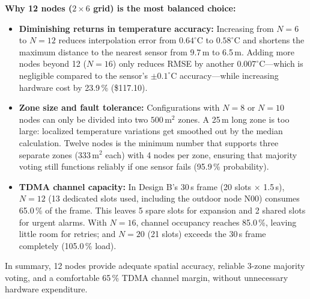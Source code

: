 \documentclass[11pt,a4paper]{report}
\begin{document}
\textbf{Why 12 nodes ($2\times6$ grid) is the most balanced choice:}
\begin{itemize}
  \item \textbf{Diminishing returns in temperature accuracy:} Increasing from $N=6$ to $N=12$ reduces interpolation error from $0.64^\circ\text{C}$ to $0.58^\circ\text{C}$ and shortens the maximum distance to the nearest sensor from 9.7\,m to 6.5\,m. Adding more nodes beyond 12 ($N=16$) only reduces RMSE by another $0.007^\circ\text{C}$---which is negligible compared to the sensor's $\pm 0.1^\circ\text{C}$ accuracy---while increasing hardware cost by 23.9\,\% (\$117.10).
  \item \textbf{Zone size and fault tolerance:} Configurations with $N=8$ or $N=10$ nodes can only be divided into two $500\,\text{m}^2$ zones. A 25\,m long zone is too large: localized temperature variations get smoothed out by the median calculation. Twelve nodes is the minimum number that supports three separate zones ($333\,\text{m}^2$ each) with 4 nodes per zone, ensuring that majority voting still functions reliably if one sensor fails (95.9\,\% probability).
  \item \textbf{TDMA channel capacity:} In Design B's 30\,s frame (20 slots $\times$ 1.5\,s), $N=12$ (13 dedicated slots used, including the outdoor node N00) consumes 65.0\,\% of the frame. This leaves 5 spare slots for expansion and 2 shared slots for urgent alarms. With $N=16$, channel occupancy reaches 85.0\,\%, leaving little room for retries; and $N=20$ (21 slots) exceeds the 30\,s frame completely (105.0\,\% load).
\end{itemize}
In summary, 12 nodes provide adequate spatial accuracy, reliable 3-zone majority voting, and a comfortable 65\,\% TDMA channel margin, without unnecessary hardware expenditure.
\end{document}
